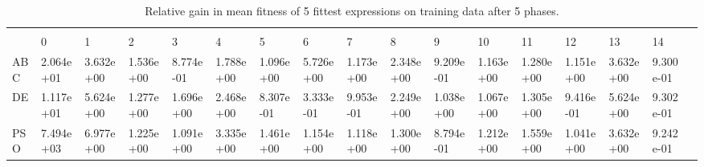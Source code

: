 \begin{landscape}
\begin{table}[]
\centering
\caption{Relative gain in mean fitness of 5 fittest expressions on training data after 5 phases.}
\label{table:5phasemeantrain}
\begin{adjustbox}{width=1.7\textwidth}
\begin{tabular}{lllllllllllllllll}
 &           &           &           &           &           &           &           &           &           &           &           &           &           &           &           &  \\
           & 0         & 1         & 2         & 3         & 4         & 5         & 6         & 7         & 8         & 9         & 10        & 11        & 12        & 13        & 14        &  \\
ABC                 & 2.064e+01 & 3.632e+00 & 1.536e+00 & 8.774e-01 & 1.788e+00 & 1.096e+00 & 5.726e+00 & 1.173e+00 & 2.348e+00 & 9.209e-01 & 1.163e+00 & 1.280e+00 & 1.151e+00 & 3.632e+00 & 9.300e-01 &  \\
DE                  & 1.117e+01 & 5.624e+00 & 1.277e+00 & 1.696e+00 & 2.468e+00 & 8.307e-01 & 3.333e-01 & 9.953e-01 & 2.249e+00 & 1.038e+00 & 1.067e+00 & 1.305e+00 & 9.416e-01 & 5.624e+00 & 9.302e-01 &  \\
PSO                 & 7.494e+03 & 6.977e+00 & 1.225e+00 & 1.091e+00 & 3.335e+00 & 1.461e+00 & 1.154e+00 & 1.118e+00 & 1.300e+00 & 8.794e-01 & 1.212e+00 & 1.559e+00 & 1.041e+00 & 3.632e+00 & 9.242e-01 &  \\

\end{tabular}
\end{adjustbox}
\end{table}



\end{landscape}
